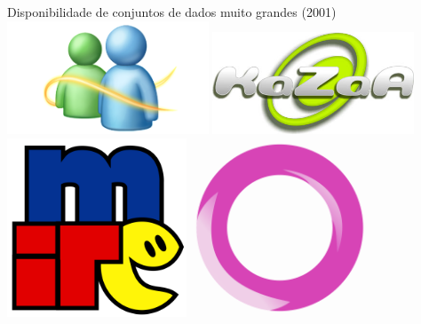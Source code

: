 \documentclass{libs/ufc_format}
\begin{document}
\begin{frame}{Disponibilidade de conjuntos de dados muito grandes (2001)}
    \centering
    \includegraphics[width=0.45\textwidth]{figuras/msn_logo}
    \includegraphics[width=0.45\textwidth]{figuras/kazaa_logo}\\
    \includegraphics[width=0.4\textwidth]{figuras/mirc_logo}
    \includegraphics[width=0.4\textwidth]{figuras/orkut_logo}
\end{frame}
\end{document}
